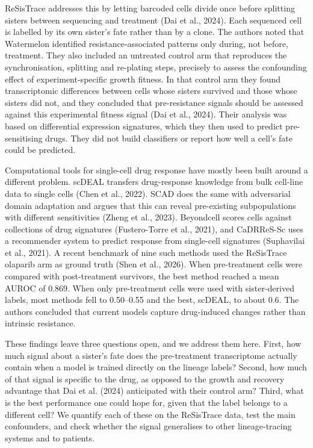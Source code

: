 \documentclass[11pt,a4paper]{article}
\begin{document}
ReSisTrace addresses this by letting barcoded cells divide once before splitting sisters between sequencing and treatment (Dai et al., 2024). Each sequenced cell is labelled by its own sister's fate rather than by a clone. The authors noted that Watermelon identified resistance-associated patterns only during, not before, treatment. They also included an untreated control arm that reproduces the synchronisation, splitting and re-plating steps, precisely to assess the confounding effect of experiment-specific growth fitness. In that control arm they found transcriptomic differences between cells whose sisters survived and those whose sisters did not, and they concluded that pre-resistance signals should be assessed against this experimental fitness signal (Dai et al., 2024). Their analysis was based on differential expression signatures, which they then used to predict pre-sensitising drugs. They did not build classifiers or report how well a cell's fate could be predicted.

Computational tools for single-cell drug response have mostly been built around a different problem. scDEAL transfers drug-response knowledge from bulk cell-line data to single cells (Chen et al., 2022). SCAD does the same with adversarial domain adaptation and argues that this can reveal pre-existing subpopulations with different sensitivities (Zheng et al., 2023). Beyondcell scores cells against collections of drug signatures (Fustero-Torre et al., 2021), and CaDRReS-Sc uses a recommender system to predict response from single-cell signatures (Suphavilai et al., 2021). A recent benchmark of nine such methods used the ReSisTrace olaparib arm as ground truth (Shen et al., 2026). When pre-treatment cells were compared with post-treatment survivors, the best method reached a mean AUROC of 0.869. When only pre-treatment cells were used with sister-derived labels, most methods fell to 0.50--0.55 and the best, scDEAL, to about 0.6. The authors concluded that current models capture drug-induced changes rather than intrinsic resistance.

These findings leave three questions open, and we address them here. First, how much signal about a sister's fate does the pre-treatment transcriptome actually contain when a model is trained directly on the lineage labels? Second, how much of that signal is specific to the drug, as opposed to the growth and recovery advantage that Dai et al. (2024) anticipated with their control arm? Third, what is the best performance one could hope for, given that the label belongs to a different cell? We quantify each of these on the ReSisTrace data, test the main confounders, and check whether the signal generalises to other lineage-tracing systems and to patients.
\end{document}
